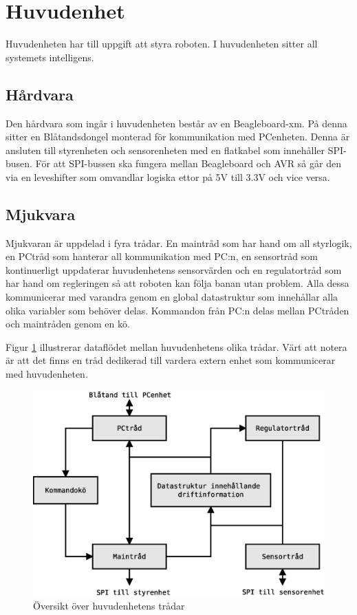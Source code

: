 
\section{Huvudenhet}
Huvudenheten har till uppgift att styra roboten. I huvudenheten sitter all systemets intelligens.

\subsection{Hårdvara}
Den hårdvara som ingår i huvudenheten består av en Beagleboard-xm. På denna sitter en Blåtandsdongel monterad för kommunikation med PCenheten. Denna är ansluten till styrenheten och sensorenheten med en flatkabel som innehåller SPI-busen. För att SPI-bussen ska fungera mellan Beagleboard och AVR så går den via en leveshifter som omvandlar logiska ettor på 5V till 3.3V och vice versa.

\subsection{Mjukvara}
Mjukvaran är uppdelad i fyra trådar. En maintråd som har hand om all styrlogik, en PCtråd som hanterar all kommunikation med PC:n, en sensortråd som kontinuerligt uppdaterar huvudenhetens sensorvärden och en regulatortråd som har hand om regleringen så att roboten kan följa banan utan problem. Alla dessa kommunicerar med varandra genom en global datastruktur som innehållar alla olika variabler som behöver delas. Kommandon från PC:n delas mellan PCtråden och maintråden genom en kö.

Figur \ref{huvud-tradar} illustrerar dataflödet mellan huvudenhetens olika trådar. Värt att notera är att det finns en tråd dedikerad till vardera extern enhet som kommunicerar med huvudenheten.

\begin{figure}[h!]
	\centering
	\includegraphics[scale=0.5]{grafik/huvud-tradar}
	\caption{Översikt över huvudenhetens trådar} \label{huvud-tradar}
\end{figure}

